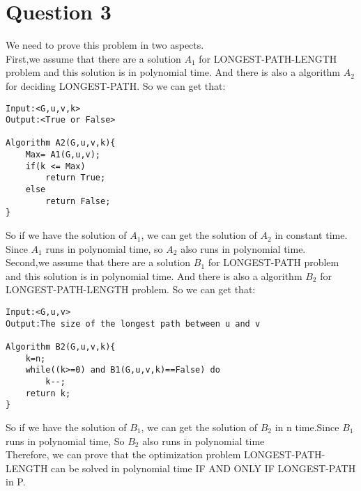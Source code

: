 \documentclass[paper=a4, fontsize=11pt]{scrartcl} %
\numberwithin{equation}{section} %
\numberwithin{figure}{section} %
\numberwithin{table}{section} %
\begin{document}
\section{\textbf{Question 3}}
We need to prove this problem in two aspects.\\
First,we assume that there are a solution $A_1$ for LONGEST-PATH-LENGTH problem and this solution is in polynomial time. And there is also a algorithm $A_2$ for deciding LONGEST-PATH. So we can get that:\\
\begin{verbatim}
Input:<G,u,v,k>
Output:<True or False>

Algorithm A2(G,u,v,k){
    Max= A1(G,u,v);
    if(k <= Max) 
        return True;
    else
        return False;
}
\end{verbatim} 
So if we have the solution of $A_1$, we can get the solution of $A_2$ in constant time. Since $A_1$ runs in polynomial time, so $A_2$ also runs in polynomial time. \\

Second,we assume that there are a solution $B_1$ for LONGEST-PATH problem and this solution is in polynomial time. And there is also a algorithm $B_2$ for  LONGEST-PATH-LENGTH problem. So we can get that:\\
\begin{verbatim}
Input:<G,u,v>
Output:The size of the longest path between u and v 

Algorithm B2(G,u,v,k){
    k=n;
    while((k>=0) and B1(G,u,v,k)==False) do
        k--;
    return k;
}
\end{verbatim} 
So if we have the solution of $B_1$, we can get the solution of $B_2$ in n time.Since $B_1$ runs in polynomial time, So $B_2$ also runs in polynomial time\\
Therefore, we can prove that the optimization problem LONGEST-PATH-LENGTH can be solved in polynomial time IF AND ONLY IF LONGEST-PATH in {P}.


\vspace{2cm}
\end{document}
